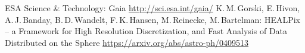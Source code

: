 \documentclass[14pt]{article} %
\begin{document}
\newpage
\begin{thebibliography}{99}
ESA Science \& Technology: Gaia \url{http://sci.esa.int/gaia/}
K.\,M.\,Gorski, E.\,Hivon, A.\,J.\,Banday, B.\,D.\,Wandelt, F.\,K.\,Hansen, M.\,Reinecke, M.\,Bartelman: HEALPix -- a Framework for High Resolution Discretization, and Fast Analysis of Data Distributed on the Sphere \url{https://arxiv.org/abs/astro-ph/0409513}

\end{thebibliography}
\end{document}
